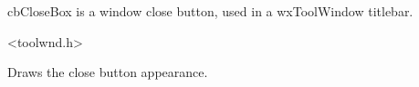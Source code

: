 %
%


\section{}\label{cbclosebox}


cbCloseBox is a window close button, used in a wxToolWindow titlebar.




<toolwnd.h>




\label{cbcloseboxdraw}


Draws the close button appearance.

